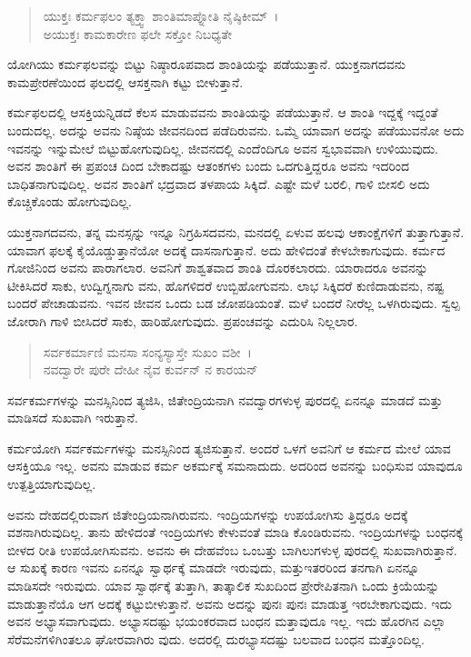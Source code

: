 \begin{verse}
ಯುಕ್ತಃ ಕರ್ಮಫಲಂ ತ್ಯಕ್ತ್ವಾ ಶಾಂತಿಮಾಪ್ನೋತಿ ನೈಷ್ಠಿಕೀಮ್~।\\ಅಯುಕ್ತಃ ಕಾಮಕಾರೇಣ ಫಲೇ ಸಕ್ತೋ ನಿಬಧ್ಯತೇ 
\end{verse}

{\small ಯೋಗಿಯು ಕರ್ಮಫಲವನ್ನು ಬಿಟ್ಟು ನಿಷ್ಠಾರೂಪವಾದ ಶಾಂತಿಯನ್ನು ಪಡೆಯುತ್ತಾನೆ. ಯುಕ್ತನಾಗದವನು ಕಾಮಪ್ರೇರಣೆಯಿಂದ ಫಲದಲ್ಲಿ ಆಸಕ್ತನಾಗಿ ಕಟ್ಟು ಬೀಳುತ್ತಾನೆ.}

ಕರ್ಮಫಲದಲ್ಲಿ ಆಸಕ್ತಿಯನ್ನಿಡದೆ ಕೆಲಸ ಮಾಡುವವನು ಶಾಂತಿಯನ್ನು ಪಡೆಯುತ್ತಾನೆ. ಆ ಶಾಂತಿ ಇದ್ದಕ್ಕೆ ಇದ್ದಂತೆ ಬಂದುದಲ್ಲ. ಅದನ್ನು ಅವನು ನಿಷ್ಠೆಯ ಜೀವನದಿಂದ ಪಡೆದಿರುವನು. ಒಮ್ಮೆ ಯಾವಾಗ ಅದನ್ನು ಪಡೆಯುವನೋ ಅದು ಇವನನ್ನು ಇನ್ನುಮೇಲೆ ಬಿಟ್ಟುಹೋಗುವುದಿಲ್ಲ. ಜೀವನದಲ್ಲಿ ಎಂದೆಂದಿಗೂ ಅವನ ಸ್ವಭಾವವಾಗಿ ಉಳಿಯುವುದು. ಅವನ ಶಾಂತಿಗೆ ಈ ಪ್ರಪಂಚ ದಿಂದ ಬೇಕಾದಷ್ಟು ಆತಂಕಗಳು ಬಂದು ಒದಗುತ್ತಿದ್ದರೂ ಅವನು ಇದರಿಂದ ಬಾಧಿತನಾಗುವುದಿಲ್ಲ. ಅವನ ಶಾಂತಿಗೆ ಭದ್ರವಾದ ತಳಪಾಯ ಸಿಕ್ಕಿದೆ. ಎಷ್ಟೇ ಮಳೆ ಬರಲಿ, ಗಾಳಿ ಬೀಸಲಿ ಅದು ಕೊಚ್ಚಿಕೊಂಡು ಹೋಗುವುದಿಲ್ಲ.

ಯುಕ್ತನಾಗದವನು, ತನ್ನ ಮನಸ್ಸನ್ನು ಇನ್ನೂ ನಿಗ್ರಹಿಸದವನು, ಮನದಲ್ಲಿ ಏಳುವ ಹಲವು ಆಕಾಂಕ್ಷೆಗಳಿಗೆ ತುತ್ತಾಗುತ್ತಾನೆ. ಯಾವಾಗ ಫಲಕ್ಕೆ ಕೈಯೊಡ್ಡುತ್ತಾನೆಯೋ ಅದಕ್ಕೆ ದಾಸನಾಗುತ್ತಾನೆ. ಅದು ಹೇಳಿದಂತೆ ಕೇಳಬೇಕಾಗುವುದು. ಕರ್ಮದ ಗೋಜಿನಿಂದ ಅವನು ಪಾರಾಗಲಾರ. ಅವನಿಗೆ ಶಾಶ್ವತವಾದ ಶಾಂತಿ ದೊರಕಲಾರದು. ಯಾರಾದರೂ ಅವನನ್ನು ಟೀಕಿಸಿದರೆ ಸಾಕು, ಉದ್ವಿಗ್ನನಾಗು ವನು, ಹೊಗಳಿದರೆ ಉಬ್ಬಿಹೋಗುವನು. ಲಾಭ ಸಿಕ್ಕಿದರೆ ಕುಣಿದಾಡುವನು, ನಷ್ಟ ಬಂದರೆ ಪೇಚಾಡುವನು. ಇವನ ಜೀವನ ಒಂದು ಬಡ ಜೋಪಡಿಯಂತೆ. ಮಳೆ ಬಂದರೆ ನೀರೆಲ್ಲ ಒಳಗಿರುವುದು. ಸ್ವಲ್ಪ ಜೋರಾಗಿ ಗಾಳಿ ಬೀಸಿದರೆ ಸಾಕು, ಹಾರಿಹೋಗುವುದು. ಪ್ರಪಂಚವನ್ನು ಎದುರಿಸಿ ನಿಲ್ಲಲಾರ.

\begin{verse}
ಸರ್ವಕರ್ಮಾಣಿ ಮನಸಾ ಸಂನ್ಯಸ್ಯಾಸ್ತೇ ಸುಖಂ ವಶೀ~।\\ನವದ್ವಾರೇ ಪುರೇ ದೇಹೀ ನೈವ ಕುರ್ವನ್ ನ ಕಾರಯನ್ 
\end{verse}

{\small ಸರ್ವಕರ್ಮಗಳನ್ನು ಮನಸ್ಸಿನಿಂದ ತ್ಯಜಿಸಿ, ಜಿತೇಂದ್ರಿಯನಾಗಿ ನವದ್ವಾರಗಳುಳ್ಳ ಪುರದಲ್ಲಿ ಏನನ್ನೂ ಮಾಡದೆ ಮತ್ತು ಮಾಡಿಸದೆ ಸುಖವಾಗಿ ಇರುತ್ತಾನೆ.}

ಕರ್ಮಯೋಗಿ ಸರ್ವಕರ್ಮಗಳನ್ನು ಮನಸ್ಸಿನಿಂದ ತ್ಯಜಿಸುತ್ತಾನೆ. ಅಂದರೆ ಒಳಗೆ ಅವನಿಗೆ ಆ ಕರ್ಮದ ಮೇಲೆ ಯಾವ ಆಸಕ್ತಿಯೂ ಇಲ್ಲ. ಅವನು ಮಾಡುವ ಕರ್ಮ ಅಕರ್ಮಕ್ಕೆ ಸಮನಾದುದು. ಅದರಿಂದ ಅವನನ್ನು ಬಂಧಿಸುವ ಯಾವುದೂ ಉತ್ಪತ್ತಿಯಾಗುವುದಿಲ್ಲ.

ಅವನು ದೇಹದಲ್ಲಿರುವಾಗ ಜಿತೇಂದ್ರಿಯನಾಗಿರುವನು. ಇಂದ್ರಿಯಗಳನ್ನು ಉಪಯೋಗಿಸು ತ್ತಿದ್ದರೂ ಅದಕ್ಕೆ ವಶನಾಗಿರುವುದಿಲ್ಲ. ತಾನು ಹೇಳಿದಂತೆ ಇಂದ್ರಿಯಗಳು ಕೇಳುವಂತೆ ಮಾಡಿ ಕೊಂಡಿರುವನು. ಇಂದ್ರಿಯಗಳನ್ನು ಬಂಧನಕ್ಕೆ ಬೀಳದ ರೀತಿ ಉಪಯೋಗಿಸುವನು. ಅವನು ಈ ದೇಹವೆಂಬ ಒಂಬತ್ತು ಬಾಗಿಲುಗಳುಳ್ಳ ಪುರದಲ್ಲಿ ಸುಖವಾಗಿರುತ್ತಾನೆ. ಆ ಸುಖಕ್ಕೆ ಕಾರಣ ಇವನು ಏನನ್ನೂ ಸ್ವಾರ್ಥಕ್ಕೆ ಮಾಡದೇ ಇರುವುದು, ಮತ್ತುಇತರರಿಂದ ತನಗಾಗಿ ಏನನ್ನೂ ಮಾಡಿಸದೇ ಇರುವುದು. ಯಾವ ಸ್ವಾರ್ಥಕ್ಕೆ ತುತ್ತಾಗಿ, ತಾತ್ಕಾಲಿಕ ಸುಖದಿಂದ ಪ್ರೇರೇಪಿತನಾಗಿ ಒಂದು ಕ್ರಿಯೆಯನ್ನು ಮಾಡುತ್ತಾನೆಯೊ ಆಗ ಅದಕ್ಕೆ ಕಟ್ಟುಬೀಳುತ್ತಾನೆ. ಅವನು ಅದನ್ನು ಪುನಃ ಪುನಃ ಮಾಡುತ್ತ ಇರಬೇಕಾಗುವುದು. ಇದು ಅವನ ಅಭ್ಯಾಸವಾಗುವುದು. ಅಭ್ಯಾಸದಷ್ಟು ಭಯಂಕರವಾದ ಬಂಧನ ಮತ್ತಾವುದೂ ಇಲ್ಲ. ಇದು ಹೊರಗಿನ ಎಲ್ಲಾ ಸೆರೆಮನೆಗಳಿಗಿಂತಲೂ ಘೋರವಾಗಿರು ವುದು. ಅದರಲ್ಲಿ ದುರಭ್ಯಾಸದಷ್ಟು ಬಲವಾದ ಬಂಧನ ಮತ್ತೊಂದಿಲ್ಲ.

